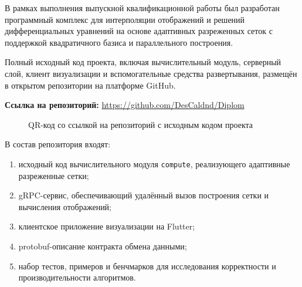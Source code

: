 \setcounter{figure}{0}
\renewcommand{\thefigure}{\Asbuk{appendicesnum}.\arabic{figure}}

В рамках выполнения выпускной квалификационной работы был разработан программный комплекс для интерполяции отображений и решений дифференциальных уравнений на основе адаптивных разреженных сеток с поддержкой квадратичного базиса и параллельного построения.

Полный исходный код проекта, включая вычислительный модуль, серверный слой, клиент визуализации и вспомогательные средства развертывания, размещён в открытом репозитории на платформе GitHub.

\textbf{Ссылка на репозиторий:} \url{https://github.com/DesCaldnd/Diplom}

\begin{figure}[H]
    \centering
    
    \vspace{1ex}
    \caption{QR-код со ссылкой на репозиторий с исходным кодом проекта}
    \label{fig:qr_code_github}
\end{figure}

В состав репозитория входят:

\begin{enumerate}
    \item исходный код вычислительного модуля \texttt{compute}, реализующего адаптивные разреженные сетки;
    \item gRPC-сервис, обеспечивающий удалённый вызов построения сетки и вычисления отображений;
    \item клиентское приложение визуализации на Flutter;
    \item protobuf-описание контракта обмена данными;
    \item набор тестов, примеров и бенчмарков для исследования корректности и производительности алгоритмов.
\end{enumerate}